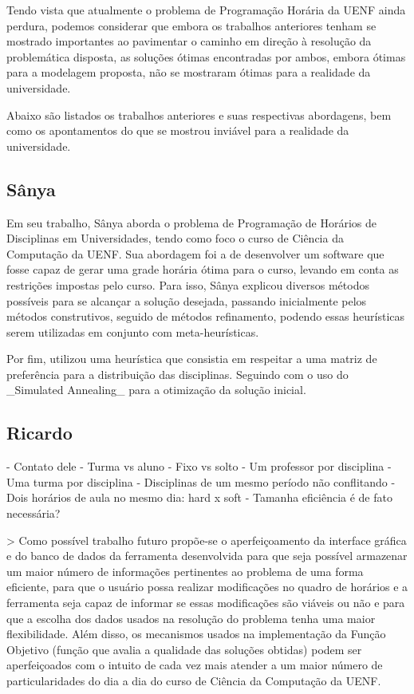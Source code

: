     Tendo vista que atualmente o problema de Programação Horária da UENF ainda perdura, podemos considerar que embora os trabalhos anteriores tenham se mostrado importantes ao pavimentar o caminho em direção à resolução da problemática disposta, as soluções ótimas encontradas por ambos, embora ótimas para a modelagem proposta, não se mostraram ótimas para a realidade da universidade.

    Abaixo são listados os trabalhos anteriores e suas respectivas abordagens, bem como os apontamentos do que se mostrou inviável para a realidade da universidade.

    \subsection{Sânya} %

        Em seu trabalho, Sânya aborda o problema de Programação de Horários de Disciplinas em Universidades, tendo como foco o curso de Ciência da Computação da UENF. Sua abordagem foi a de desenvolver um software que fosse capaz de gerar uma grade horária ótima para o curso, levando em conta as restrições impostas pelo curso. Para isso, Sânya explicou diversos métodos possíveis para se alcançar a solução desejada, passando inicialmente pelos métodos construtivos, seguido de métodos refinamento, podendo essas heurísticas serem utilizadas em conjunto com meta-heurísticas.

        Por fim, utilizou uma heurística que consistia em respeitar a uma matriz de preferência para a distribuição das disciplinas. Seguindo com o uso do _Simulated Annealing_ para a otimização da solução inicial.

    \subsection{Ricardo} %

        - Contato dele
        - Turma vs aluno
        - Fixo vs solto
        - Um professor por disciplina
        - Uma turma por disciplina
        - Disciplinas de um mesmo período não conflitando
        - Dois horários de aula no mesmo dia: hard x soft
        - Tamanha eficiência é de fato necessária?

        > Como possível trabalho futuro propõe-se o aperfeiçoamento da interface gráfica e do banco de dados da ferramenta desenvolvida para que seja possível armazenar um maior número de informações pertinentes ao problema de uma forma eficiente, para que o usuário possa realizar modificações no quadro de horários e a ferramenta seja capaz de informar se essas modificações são viáveis ou não e para que a escolha dos dados usados na resolução do problema tenha uma maior flexibilidade. Além disso, os mecanismos usados na implementação da Função Objetivo (função que avalia a qualidade das soluções obtidas) podem ser aperfeiçoados com o intuito de cada vez mais atender a um maior número de particularidades do dia a dia do curso de Ciência da Computação da UENF.

